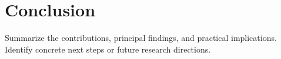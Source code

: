 \chapter{Conclusion}
\label{ch:conclusion}

Summarize the contributions, principal findings, and practical implications.
Identify concrete next steps or future research directions.
